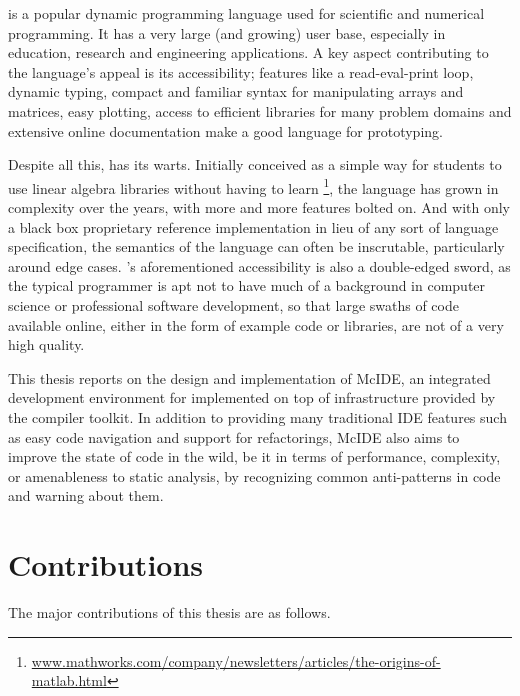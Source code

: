 \matlab is a popular dynamic programming language used for scientific and
numerical programming. It has a very large (and growing) user base, especially
in education, research and engineering applications. A key aspect contributing
to the language's appeal is its accessibility; features like a read-eval-print
loop, dynamic typing, compact and familiar syntax for manipulating arrays and
matrices, easy plotting, access to efficient libraries for many problem domains
and extensive online documentation make \matlab a good language for
prototyping.

Despite all this, \matlab has its warts. Initially conceived as a simple way
for students to use \fortran linear algebra libraries without having to learn
\fortran\footnote{\url{www.mathworks.com/company/newsletters/articles/the-origins-of-matlab.html}},
the language has grown in complexity over the years, with more and more
features bolted on. And with only a black box proprietary reference
implementation in lieu of any sort of language specification, the semantics of
the language can often be inscrutable, particularly around edge cases.
\matlab's aforementioned accessibility is also a double-edged sword, as the
typical \matlab programmer is apt not to have much of a background in computer
science or professional software development, so that large swaths of \matlab
code available online, either in the form of example code or libraries, are not
of a very high quality.

This thesis reports on the design and implementation of McIDE, an integrated
development environment for \matlab implemented on top of infrastructure
provided by the \mclab compiler toolkit. In addition to providing many
traditional IDE features such as easy code navigation and support for
refactorings, McIDE also aims to improve the state of \matlab code in the wild,
be it in terms of performance, complexity, or amenableness to static analysis,
by recognizing common anti-patterns in \matlab code and warning about them.

\section{Contributions}

The major contributions of this thesis are as follows.


